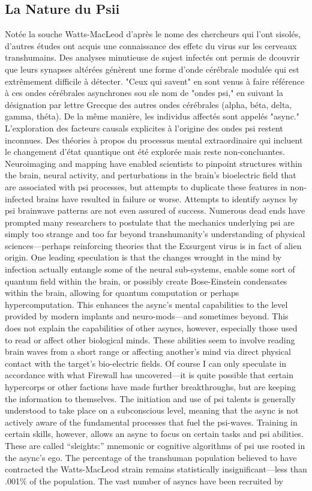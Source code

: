 \subsection{La Nature du Psii} Notée la souche Watts-MacLeod d'après le nome des chercheurs qui l'ont sisolés, d'autres études ont acquis une connaissance des effetc du virus sur les cerveaux transhumains. Des analyses minutieuse de sujest infectés ont permis de dcouvrir que leurs synapses altérées génèrent une forme d'onde cérébrale modulée qui est extrêmement difficile à détecter. "Ceux qui savent" en sont venus à faire référence à ces ondes cérébrales asynchrones sou sle nom de "ondes psi," en suivant la désignation par lettre Grecque  des autres ondes cérébrales (alpha, béta, delta, gamma, théta). De la même manière, les individus affectés sont appelés "async." L'exploration des facteurs causals explicites à l'origine des ondes psi restent inconnues. Des théories à propos du processus mental extraordinaire qui incluent le changement d'état quantique ont été explorée mais reste non-concluantes. Neuroimaging and mapping have enabled scientists to pinpoint structures within the brain, neural activity, and perturbations in the brain’s bioelectric field that are associated with psi processes, but attempts to duplicate these features in non-infected brains have resulted in failure or worse. Attempts to identify asyncs by psi brainwave patterns are not even assured of success. Numerous dead ends have prompted many researchers to postulate that the mechanics underlying psi are simply too strange and too far beyond transhumanity’s understanding of physical sciences—perhaps reinforcing theories that the Exsurgent virus is in fact of alien origin. One leading speculation is that the changes wrought in the mind by infection actually entangle some of the neural sub-systems, enable some sort of quantum field within the brain, or possibly create Bose-Einstein condensates within the brain, allowing for quantum computation or perhaps hypercomputation. This enhances the async’s mental capabilities to the level provided by modern implants and neuro-mods—and sometimes beyond. This does not explain the capabilities of other asyncs, however, especially those used to read or affect other biological minds. These abilities seem to involve reading brain waves from a short range or affecting another’s mind via direct physical contact with the target’s bio-electric fields. Of course I can only speculate in accordance with what Firewall has uncovered—it is quite possible that certain hypercorps or other factions have made further breakthroughs, but are keeping the information to themselves. The initiation and use of psi talents is generally understood to take place on a subconscious level, meaning that the async is not actively aware of the fundamental processes that fuel the psi-waves. Training in certain skills, however, allows an async to focus on certain tasks and psi abilities. These are called “sleights:” mnemonic or cognitive algorithms of psi use rooted in the async’s ego. The percentage of the transhuman population believed to have contracted the Watts-MacLeod strain remains statistically insignificant—less than .001\% of the population. The vast number of asyncs have been recruited by 